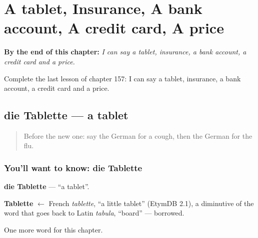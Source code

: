 
\chapter{A tablet, Insurance, A bank account, A credit card, A price}
\label{ch:ge-a-tablet-insurance-a-bank-account-a-credit-card-a-price}

\begin{chapteropening}
\textbf{By the end of this chapter:} \emph{I can say a tablet, insurance, a bank account, a credit card and a price.}

Complete the last lesson of chapter 157: I can say a tablet, insurance, a bank account, a credit card and a price.
\end{chapteropening}

\section[die Tablette]{die Tablette — a tablet}

\label{lesson:GE-C157-tablette}



\begin{quote}
Before the new one: say the German for a cough, then the German for the flu.
\end{quote}

\subsection*{You'll want to know: die Tablette}
\textbf{die Tablette} — \textquotedblleft{}a tablet\textquotedblright{}.

\begin{cousinweb}
\textbf{Tablette} $\leftarrow$ French \emph{tablette}, \textquotedblleft{}a little tablet\textquotedblright{} (EtymDB 2.1), a diminutive of the word that goes back to Latin \emph{tabula}, \textquotedblleft{}board\textquotedblright{} — borrowed.
\end{cousinweb}

\begin{grammarlens}[title={What you've built}]
One more word for this chapter.
\end{grammarlens}

